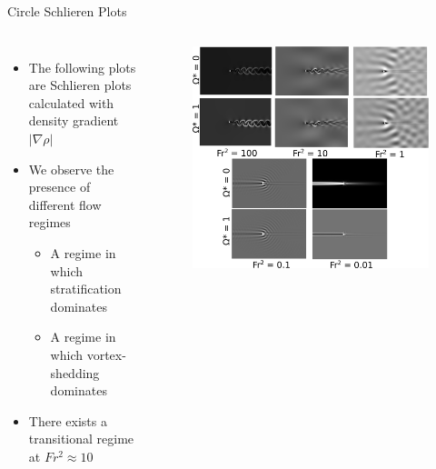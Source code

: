 \documentclass[aspectratio=169,xcolor=dvipsnames]{beamer}
\begin{document}
\begin{frame}{Circle Schlieren Plots}
    \begin{columns}[c]
        \begin{itemize}
            \item The following plots are Schlieren plots calculated with density gradient $|\nabla \rho|$ 
            \item We observe the presence of different flow regimes
            \begin{itemize}
                \item A regime in which stratification dominates
                \item A regime in which vortex-shedding dominates
            \end{itemize}
            \item There exists a transitional regime at $Fr^2 \approx 10$
        \end{itemize}
        \begin{figure}
            \includegraphics[width=.8\textwidth]{figures/circleschlieren.png}
        \end{figure}
    \end{columns}
\end{frame}

\end{document}
